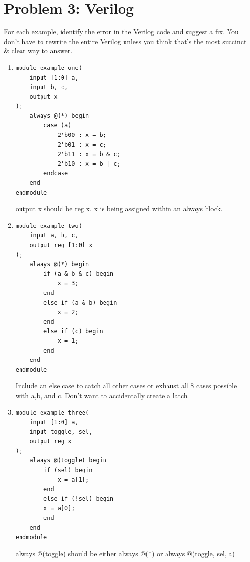 \section*{Problem 3: Verilog}
For each example, identify the error in the Verilog code and suggest a fix. You don't have to rewrite the entire Verilog unless you think that's the most succinct \& clear way to answer.
\begin{enumerate}[label=(\alph*)]

\item \begin{verbatim}
module example_one(
	input [1:0] a,
	input b, c,
	output x
);
	always @(*) begin
	    case (a)
	        2'b00 : x = b;
	        2'b01 : x = c;
	        2'b11 : x = b & c;
	        2'b10 : x = b | c;
	    endcase
	end
endmodule
\end{verbatim}

\begin{solution}
output x should be reg x. x is being assigned within an always block. 
\end{solution}

\item \begin{verbatim}
module example_two(
	input a, b, c,
	output reg [1:0] x
);
    always @(*) begin
    	if (a & b & c) begin
    		x = 3;
    	end
    	else if (a & b) begin
    		x = 2;
    	end
    	else if (c) begin
    		x = 1;
    	end
    end
endmodule
\end{verbatim}

\begin{solution}
Include an else case to catch all other cases or exhaust all 8 cases possible with a,b, and c. Don't want to accidentally create a latch.
\end{solution}

\item \begin{verbatim}
module example_three(
	input [1:0] a,
	input toggle, sel, 
	output reg x
);
    always @(toggle) begin
        if (sel) begin
            x = a[1];
        end
        else if (!sel) begin
    	x = a[0];
        end
    end
endmodule
\end{verbatim}

\begin{solution}
always @(toggle) should be either always @(*) or always @(toggle, sel, a)
\end{solution}

\end{enumerate}
